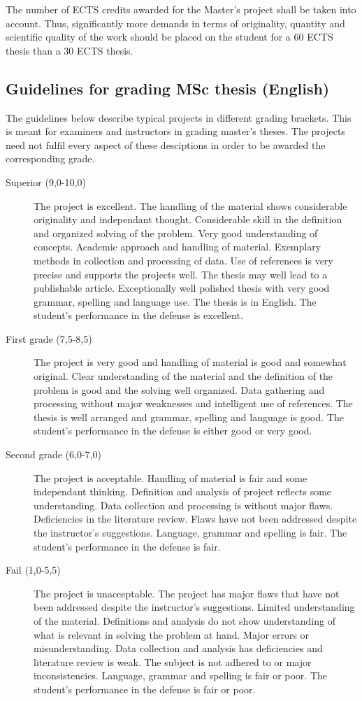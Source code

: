 The number of ECTS credits awarded for the Master's project shall be taken into account.  
Thus, significantly more demands in terms of originality, quantity and scientific quality of the work should be placed on the student for a 60 ECTS thesis than a 30 ECTS thesis.

\subsection{Guidelines for grading MSc thesis (English)}
The guidelines below describe typical projects in different grading brackets.  
This is meant for
examiners and instructors in grading master's theses.  
The projects need not fulfil every aspect of
these desciptions in order to be awarded the corresponding grade.
\begin{description}
\item [Superior (9,0-10,0)]
  The project is excellent.  
The handling of the material shows considerable originality and independant thought.
  Considerable skill in the definition and organized solving of the problem.
  Very good understanding of concepts.
  Academic approach and handling of material.
  Exemplary methods in collection and processing of data.
  Use of references is very precise and supports the projects well.
  The thesis may well lead to a publishable article.
  Exceptionally well polished thesis with very good grammar, spelling and language use.
  The thesis is in English.
  The student's performance in the defense is excellent.
\item[First grade (7,5-8,5)]
  The project is very good and handling of material is good and somewhat original.
  Clear understanding of the material and the definition of the problem is good and the solving well organized.
  Data gathering and processing without major weaknesses and intelligent use of references.
  The thesis is well arranged and grammar, spelling and language is good.
  The student's performance in the defense is either good or very good.
\item[Second grade (6,0-7,0)]
  The project is acceptable.
  Handling of material is fair and some independant thinking.
  Definition and analysis of project reflects some understanding.
  Data collection and processing is without major flaws.
  Deficiencies in the literature review.
  Flaws have not been addressed despite the instructor's suggestions.
  Language, grammar and spelling is fair.
  The student's performance in the defense is fair.
\item[Fail (1,0-5,5)]
  The project is unacceptable.
  The project has major flaws that have not been addressed despite the instructor's suggestions.
  Limited understanding of the material.
  Definitions and analysis do not show understanding of what is relevant in solving the problem at hand.  
Major errors or misunderstanding.
  Data collection and analysis has deficiencies and literature review is weak.
  The subject is not adhered to or major inconsistencies.
  Language, grammar and spelling is fair or poor.
  The student's performance in the defense is fair or poor.
\end{description}


